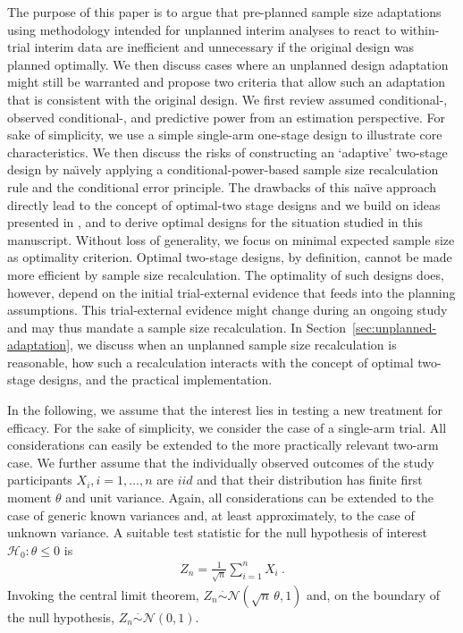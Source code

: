 \documentclass[12pt]{article}
\begin{document}
The purpose of this paper is to argue that pre-planned sample size adaptations
using methodology intended for unplanned interim analyses to react to within-trial interim data are inefficient and unnecessary if the original design was planned optimally.
We then discuss cases where an unplanned design adaptation might still be warranted and propose two criteria that allow such an adaptation that is
consistent with the original design.
We first review assumed \mbox{conditional-,} observed \mbox{conditional-,} and predictive power
from an estimation perspective.
For sake of simplicity,
we use a simple single-arm one-stage design to illustrate core
characteristics.
We then discuss the risks of constructing an
`adaptive' two-stage design by na\"{\i}vely applying
a conditional-power-based sample size recalculation rule and the
conditional error principle.
The drawbacks of this na\"{\i}ve approach directly lead to the
concept of optimal-two stage designs and
we build on ideas presented in \cite{brannath2004,pilz2019}, and
\cite{adoptrjss2020} to derive optimal designs for the situation studied in
this manuscript.
Without loss of generality, we focus on minimal expected sample size as optimality criterion.
Optimal two-stage designs, by definition, cannot be made more
efficient by sample size recalculation.
The optimality of such designs does, however, depend on the initial trial-external evidence that feeds into the planning assumptions.
This trial-external evidence might change during an ongoing study
and may thus mandate a sample size recalculation.
In Section~\ref{sec:unplanned-adaptation},
we discuss when an unplanned sample size recalculation is
reasonable,
how such a recalculation interacts with the concept of
optimal two-stage designs,
and the practical implementation.

In the following,
we assume that the interest lies in testing a new treatment for efficacy.
For the sake of simplicity,
we consider the case of a single-arm trial.
All considerations can easily be extended to the more
practically relevant two-arm case.
We further assume that the individually observed outcomes of the study participants $X_i, i = 1,\ldots,n$ are $iid$ and that their distribution has finite first moment $\theta$ and unit variance.
Again, all considerations can be extended to the case of
generic known variances and,
at least approximately, to the case of unknown variance.
A suitable test statistic for the null hypothesis of interest~${\mathcal{H}_0:\theta\leq0}$ is
\begin{align}
    Z_n = \frac{1}{\sqrt{n}} \sum_{i=1}^n X_i \ .
\end{align}
Invoking the central limit theorem,
$Z_n\stackrel{\cdot}{\sim}\mathcal{N}(\sqrt{n}\,\theta, 1)$
and,
on the boundary of the null hypothesis, $Z_n\stackrel{\cdot}{\sim}\mathcal{N}(0, 1)$.
\end{document}
